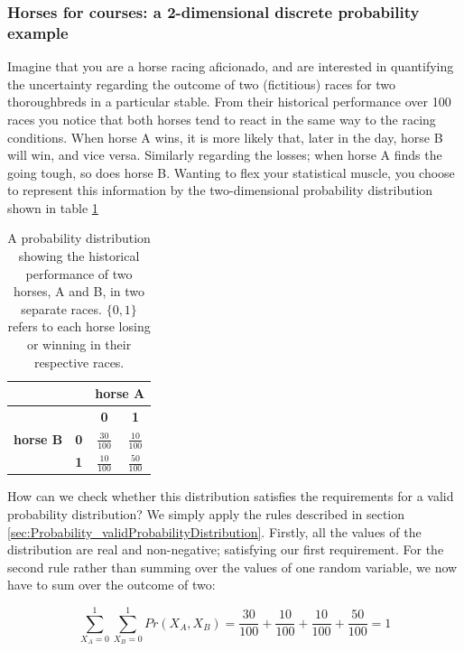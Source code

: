 \documentclass[11pt,fullpage]{book}
\begin{document}
\subsubsection{Horses for courses: a 2-dimensional discrete probability example}\label{sec:Probability_biasedCoinsTwoDimensionalDiscrete}
Imagine that you are a horse racing aficionado, and are interested in quantifying the uncertainty regarding the outcome of two (fictitious) races for two thoroughbreds in a particular stable. From their historical performance over 100 races you notice that both horses tend to react in the same way to the racing conditions. When horse A wins, it is more likely that, later in the day, horse B will win, and vice versa. Similarly regarding the losses; when horse A finds the going tough, so does horse B. Wanting to flex your statistical muscle, you choose to represent this information by the two-dimensional probability distribution shown in table \ref{tab:Probability_coinBiased}

\begin{table}[htbp]
  \centering
    \begin{tabular}{rrcc}
    \toprule
          &       & \multicolumn{2}{c}{\textbf{horse A}} \\
    \midrule
          &       & \textbf{0} & \textbf{1} \\
    \multicolumn{1}{c}{\textbf{horse B}} & \multicolumn{1}{c}{\textbf{0}} & $\frac{30}{100}$   & $\frac{10}{100}$ \\
    \multicolumn{1}{c}{} & \multicolumn{1}{c}{\textbf{1}} & $\frac{10}{100}$   & $\frac{50}{100}$ \\
    \bottomrule
    \end{tabular}%
  \caption{A probability distribution showing the historical performance of two horses, A and B, in two separate races. $\{0,1\}$ refers to each horse losing or winning in their respective races.}\label{tab:Probability_coinBiased}
\end{table}

How can we check whether this distribution satisfies the requirements for a valid probability distribution? We simply apply the rules described in section \ref{sec:Probability_validProbabilityDistribution}. Firstly, all the values of the distribution are real and non-negative; satisfying our first requirement. For the second rule rather than summing over the values of one random variable, we now have to sum over the outcome of two:

\begin{equation}\label{eq:Probability_discreteTwoDimensionalCoinSum}
\sum\limits_{X_A=0}^{1}\sum\limits_{X_B=0}^{1} Pr(X_A,X_B) = \frac{30}{100} + \frac{10}{100}  + \frac{10}{100}  + \frac{50}{100}  = 1
\end{equation}
\end{document}
